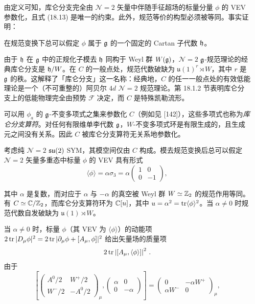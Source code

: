 由定义可知，库仑分支完全由 $\mathcal N=2$ 矢量中伴随手征超场的标量分量 $\phi$ 的 VEV 参数化，且式 (18.13) 是唯一的约束。此外，规范等价的构型必须被等同。事实证明：

\begin{proposition}[18.12]
在规范变换下总可以假定 $\phi$ 属于 $\mathfrak{g}$ 的一个固定的 Cartan 子代数 $\mathfrak{h}$。
\end{proposition}

由于 $\mathfrak{h}$ 在 $\mathfrak{g}$ 中的正规化子模去 $\mathfrak{h}$ 同构于 Weyl 群 $W(\mathfrak{g})$，$\mathcal N=2$ $\mathfrak{g}$-规范理论的经典库仑分支是 $\mathfrak{h}/W$。在 $C$ 的一般点处，规范代数破缺为 $\mathfrak{u}(1)^r\rtimes W$，其中 $r$ 是 $\mathfrak{g}$ 的秩。这解释了「库仑分支」这一名称：经典地，$C$ 的任一一般点处的有效低能理论是一个（不可重整的）阿贝尔 $4d$ $\mathcal N=2$ 规范理论。第 18.1.2 节表明库仑分支上的低能物理完全由预势 $\mathcal F$ 决定，而 $C$ 是特殊凯勒流形。

可以用 $\phi_a$ 的 $\mathfrak{g}$-不变多项式之集来参数化 $C$（例如见 [142]），这些多项式也称为\emph{库仑分支算符}。对任何有限维单李代数 $\mathfrak{g}$，$W$-不变多项式环是有限生成的，且生成元之间没有关系。因此 $C$ 被库仑分支算符无关系地参数化。

\begin{example}[18.13]
考虑纯 $\mathcal N=2$ $\mathfrak{su}(2)$ SYM，其模空间仅由 $C$ 构成。模去规范变换后总可以假定 $\mathcal N=2$ 矢量多重态中标量 $\phi$ 的 VEV 具有形式
\begin{equation}
\langle\phi\rangle=\alpha\sigma_3=\alpha
\begin{pmatrix} 1 & 0\\ 0 & -1\end{pmatrix}, \tag{18.16}
\end{equation}
\end{example}

其中 $\alpha$ 是复数，而对应于 $\alpha$ 与 $-\alpha$ 的真空被 Weyl 群 $W\simeq\mathbb{Z}_2$ 的规范作用等同。有 $C\simeq\mathbb{C}/\mathbb{Z}_2$，而库仑分支算符环为 $\mathbb{C}[u]$，其中 $u=\alpha^2=\operatorname{tr}\langle\phi\rangle^2$。当 $\alpha\ne 0$ 时规范代数自发破缺为 $\mathfrak{u}(1)\rtimes W$。

当 $\alpha\ne0$ 时，标量 $\phi$（其 VEV 为 $\langle\phi\rangle$）的动能项 $2\operatorname{tr}|D_\mu\phi|^2=2\operatorname{tr}|\partial_\mu\phi+[A_\mu,\phi]|^2$ 给出矢量场的质量项
\[
2\operatorname{tr}\left|[A_\mu,\langle\phi\rangle]\right|^2\,.
\]
由于
\[
\left[
\begin{pmatrix} A^0/2 & W^+/2\\ W^-/2 & -A^0/2\end{pmatrix}_\mu,
\begin{pmatrix} \alpha & 0\\ 0 & -\alpha\end{pmatrix}
\right]
=\begin{pmatrix} 0 & -\alpha W^+\\ \alpha W^- & 0\end{pmatrix}_\mu,
\]

